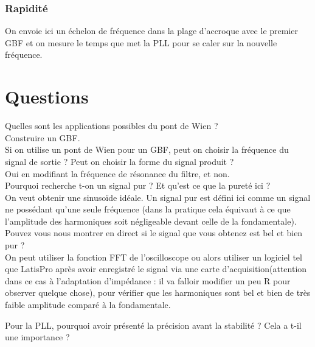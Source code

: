 \documentclass[12pt,prb,aps,epsf]{report}
\begin{document}
	\subsubsection{Rapidité}
	On envoie ici un échelon de fréquence dans la plage d'accroque avec le premier GBF et on mesure le temps que met la PLL pour se caler sur la nouvelle fréquence.
	
\section*{Questions}
Quelles sont les applications possibles du pont de Wien ?\\
Construire un GBF.\\

Si on utilise un pont de Wien pour un GBF, peut on choisir la fréquence du signal de sortie ? Peut on choisir la forme du signal produit ?\\
Oui en modifiant la fréquence de résonance du filtre, et non.\\

Pourquoi recherche t-on un signal pur ? Et qu'est ce que la pureté ici ?\\
On veut obtenir une sinusoïde idéale. Un signal pur est défini ici comme un signal ne possédant qu'une seule fréquence (dans la pratique cela équivaut à ce que l'amplitude des harmoniques soit négligeable devant celle de la fondamentale).\\

Pouvez vous nous montrer en direct si le signal que vous obtenez est bel et bien pur ?\\
On peut utiliser la fonction FFT de l'oscilloscope ou alors utiliser un logiciel tel que LatisPro après avoir enregistré le signal via une carte d'acquisition(attention dans ce cas à l'adaptation d'impédance : il va falloir modifier un peu R pour observer quelque chose), pour vérifier que les harmoniques sont bel et bien de très faible amplitude comparé à la fondamentale.

Pour la PLL, pourquoi avoir présenté la précision avant la stabilité ? Cela a t-il une importance ?\\
\end{document}
